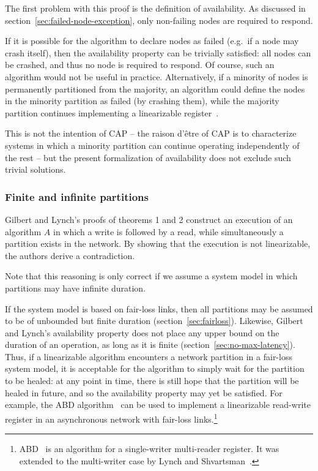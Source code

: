 \documentclass[a4paper,twocolumn,10pt]{article}
\begin{document}
The first problem with this proof is the definition of availability. As discussed in
section~\ref{sec:failed-node-exception}, only non-failing nodes are required to respond.

If it is possible for the algorithm to declare nodes as failed (e.g.\ if a node may crash itself),
then the availability property can be trivially satisfied: all nodes can be crashed, and thus no
node is required to respond. Of course, such an algorithm would not be useful in practice.
Alternatively, if a minority of nodes is permanently partitioned from the majority, an algorithm
could define the nodes in the minority partition as failed (by crashing them), while the majority
partition continues implementing a linearizable register~\cite{Attiya1995bm}.

This is not the intention of CAP -- the raison d'\^{e}tre of CAP is to characterize systems in which
a minority partition can continue operating independently of the rest -- but the present
formalization of availability does not exclude such trivial solutions.

\subsubsection{Finite and infinite partitions}

Gilbert and Lynch's proofs of theorems 1 and 2 construct an execution of an algorithm $A$ in which a
write is followed by a read, while simultaneously a partition exists in the network. By showing that
the execution is not linearizable, the authors derive a contradiction.

Note that this reasoning is only correct if we assume a system model in which partitions may have
infinite duration.

If the system model is based on fair-loss links, then all partitions may be assumed to be of
unbounded but finite duration (section~\ref{sec:fairloss}). Likewise, Gilbert and Lynch's
availability property does not place any upper bound on the duration of an operation, as long as it
is finite (section~\ref{sec:no-max-latency}). Thus, if a linearizable algorithm encounters a
network partition in a fair-loss system model, it is acceptable for the algorithm to simply wait for
the partition to be healed: at any point in time, there is still hope that the partition will be
healed in future, and so the availability property may yet be satisfied. For example, the ABD
algorithm~\cite{Attiya1995bm} can be used to implement a linearizable read-write register in an
asynchronous network with fair-loss links.\footnote{ABD~\cite{Attiya1995bm} is an algorithm for a
single-writer multi-reader register. It was extended to the multi-writer case by Lynch and
Shvartsman~\cite{Lynch1997gr}.}
\end{document}
